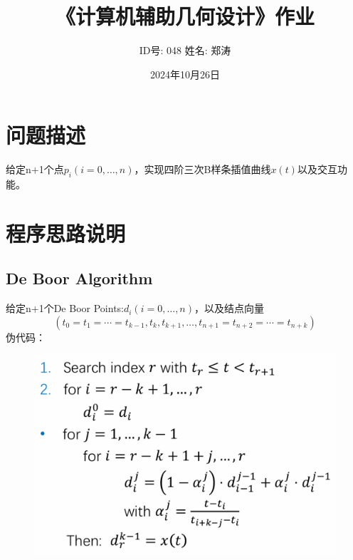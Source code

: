 \documentclass{article}
\begin{document}
	
	\title{《计算机辅助几何设计》作业}
	\author{ID号: 048  \qquad  姓名: 郑涛}  %
	\date{2024年10月26日}
	\maketitle

\section{问题描述}
	给定n+1个点$p_i(i=0,\dots,n)$，实现四阶三次B样条插值曲线$x(t)$以及交互功能。
\section{程序思路说明}
\subsection{De Boor Algorithm}
给定n+1个De Boor Points:$d_i(i=0,\dots,n)$，以及结点向量
$$(t_0=t_1=\cdots=t_{k-1},t_k,t_{k+1},\dots,t_{n+1}=t_{n+2}=\cdots=t_{n+k})$$
伪代码：
\begin{figure}[H]
	\flushleft
	\includegraphics[scale=0.5]{"De Boor Algorithm"}
	\label{fig:de-boor-algorithm}
\end{figure}
\end{document}
